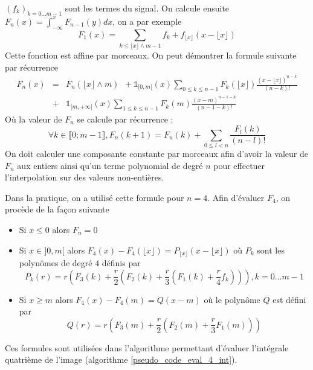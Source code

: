 $(f_k)_{k=0...m-1}$ sont les termes du signal. On calcule ensuite $F_{n}(x)=\int_{-\infty}^{x}F_{n-1}(y)dx$, on a par exemple
\begin{equation*}
F_{1}(x)=\underset{k\le \lfloor x\rfloor \wedge m-1}{\sum}f_{k}+ f_{\lfloor x\rfloor}
(x-\lfloor x\rfloor)
\end{equation*}
Cette fonction est affine par morceaux. On peut démontrer la formule suivante par récurrence
\begin{eqnarray*}
F_{n}(x) &=& F_{n}(\lfloor x\rfloor \wedge m)~~+\mathds{1}_{[0,m[}(x) \underset{0\le k \le n-1}{\sum}F_{k}(\lfloor x \rfloor) \frac{(x-\lfloor x \rfloor)^{n-k}}{(n-k)!}\\
          &+&\mathds{1}_{[m,+\infty[}(x)\underset{1\le k \le n-1}{\sum}F_{k}(m) \frac{(x-m)^{n-1-k}}{(n-1-k)!}
\end{eqnarray*}
Où la valeur de $F_{n}$ se calcule par récurrence :
\begin{equation*}
\forall k \in \llbracket 0 ;m-1 \rrbracket, F_{n}(k+1)=F_{n}(k)+\underset{0\le l < n}{\sum} \frac{F_{l}(k)}{(n-l)!}
\end{equation*}
On doit calculer une composante constante par morceaux afin d'avoir la valeur de $F_{n}$ aux entiers ainsi qu'un terme polynomial de degré $n$ pour effectuer l'interpolation sur des valeurs non-entières.

Dans la pratique, on a utilisé cette formule pour $n=4$. Afin d'évaluer $F_4$, on procède de la façon suivante 
\begin{itemize}
\item Si $x\le 0$ alors $F_{n}=0$
\item Si $x\in ]0 , m[$ alors $F_{4}(x)-F_{4}(\lfloor x \rfloor)=P_{\lfloor x \rfloor}(x-\lfloor x \rfloor)$ où $P_k$ sont les polynômes de degré $4$ définis par
\begin{equation*}
P_k (r) =r \left( F_{3}(k) +\frac{r}{2} \left(F_{2}(k)+ \frac{r}{3}\left(F_{1}(k)+\frac{r}{4} f_{k}\right)\right)\right), k=0...m-1
\end{equation*}
\item Si $x\ge m$ alors $F_{4}(x)-F_{4}(m)=Q(x-m)$ où le polynôme $Q$ est défini par
\begin{equation*}
Q(r)=r \left(F_{3}(m)+\frac{r}{2} \left( F_{2}(m) + \frac{r}{3} F_1 (m)\right)\right)
\end{equation*}

\end{itemize}
Ces formules sont utilisées dans l'algorithme permettant d'évaluer l'intégrale quatrième de l'image (algorithme \ref{pseudo_code_eval_4_int}).

